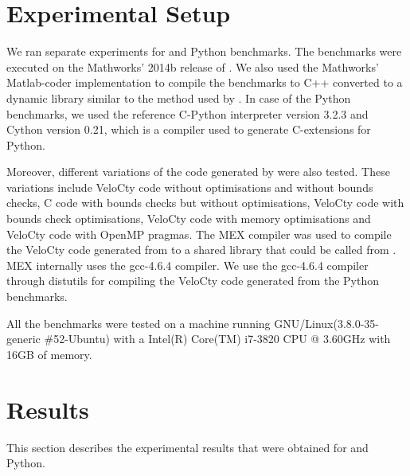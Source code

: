 \section{Experimental Setup}
We ran separate experiments for \matlab and Python benchmarks. The \matlab benchmarks were executed on the Mathworks' 2014b release of \matlab. We also used the Mathworks' Matlab-coder implementation to compile the benchmarks to C++ converted to a dynamic library similar to the method used by \velocty. In case of the Python benchmarks, we used the reference C-Python interpreter version 3.2.3  and Cython\cite{cython} version 0.21, which is a compiler used to generate C-extensions for Python.

Moreover, different variations of the code generated by \velocty were also tested. These variations include VeloCty code without optimisations and without bounds checks, C code with bounds checks but without optimisations, VeloCty code with bounds check optimisations, VeloCty code with memory optimisations and VeloCty code with OpenMP pragmas. The MEX compiler was used to compile the VeloCty code generated from \matlab to a shared library that could be called from \matlab. MEX internally uses the gcc-4.6.4 compiler. We use the gcc-4.6.4 compiler through distutils for compiling the VeloCty code generated from the Python benchmarks. 

All the benchmarks were tested on a machine running GNU/Linux(3.8.0-35-generic \#52-Ubuntu) with a Intel(R) Core(TM) i7-3820 CPU @ 3.60GHz with 16GB of memory. 
\section{Results}
This section describes the experimental results that were obtained for \matlab and Python.
